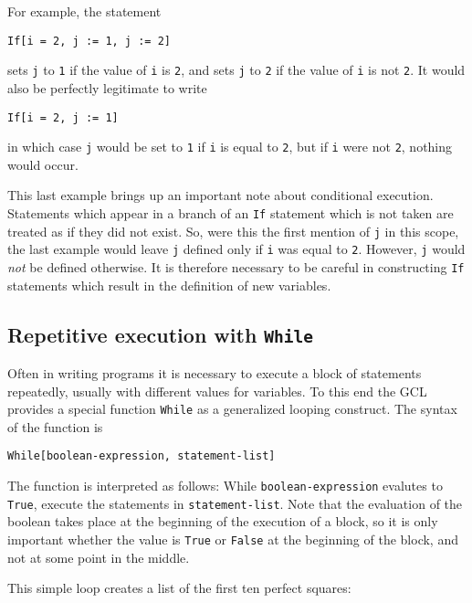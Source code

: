For example, the statement

\begin{verbatim}
If[i = 2, j := 1, j := 2]
\end{verbatim}

\noindent sets \verb+j+ to \verb+1+ if the value of \verb+i+ is
\verb+2+, and sets \verb+j+ to \verb+2+ if the value of \verb+i+ is
not \verb+2+.  It would also be perfectly legitimate to write

\begin{verbatim}
If[i = 2, j := 1]
\end{verbatim}

\noindent in which case \verb+j+ would be set to \verb+1+ if \verb+i+
is equal to \verb+2+, but if \verb+i+ were not \verb+2+, nothing would
occur.

This last example brings up an important note about conditional
execution.  Statements which appear in a branch of an \verb+If+
statement which is not taken are treated as if they did not exist.
So, were this the first mention of \verb+j+ in this scope, the last
example would leave \verb+j+ defined only if \verb+i+ was equal to
\verb+2+.  However, \verb+j+ would {\em not} be defined otherwise.  It
is therefore necessary to be careful in constructing \verb+If+
statements which result in the definition of new variables.

\subsection{Repetitive execution with {\tt While}}

Often in writing programs it is necessary to execute a block of
statements repeatedly, usually with different values for variables.
To this end the GCL provides a special function \verb+While+ as a
generalized looping construct.  The syntax of the function is

\begin{verbatim}
While[boolean-expression, statement-list]
\end{verbatim}

The function is interpreted as follows: While
\verb+boolean-expression+ evalutes to \verb+True+, execute the
statements in \verb+statement-list+.  Note that the evaluation of the
boolean takes place at the beginning of the execution of a block, so
it is only important whether the value is \verb+True+ or \verb+False+
at the beginning of the block, and not at some point in the middle.

This simple loop creates a list of the first ten perfect squares: 

